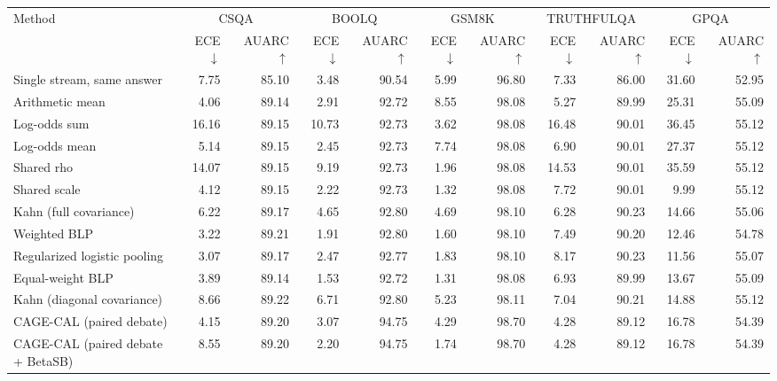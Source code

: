 \begin{tabular}{lrrrrrrrrrr}
\toprule
Method & \multicolumn{2}{c}{CSQA} & \multicolumn{2}{c}{BOOLQ} & \multicolumn{2}{c}{GSM8K} & \multicolumn{2}{c}{TRUTHFULQA} & \multicolumn{2}{c}{GPQA} \\
 & ECE $\downarrow$ & AUARC $\uparrow$ & ECE $\downarrow$ & AUARC $\uparrow$ & ECE $\downarrow$ & AUARC $\uparrow$ & ECE $\downarrow$ & AUARC $\uparrow$ & ECE $\downarrow$ & AUARC $\uparrow$ \\
\midrule
Single stream, same answer & 7.75 & 85.10 & 3.48 & 90.54 & 5.99 & 96.80 & 7.33 & 86.00 & 31.60 & 52.95 \\
Arithmetic mean & 4.06 & 89.14 & 2.91 & 92.72 & 8.55 & 98.08 & 5.27 & 89.99 & 25.31 & 55.09 \\
Log-odds sum & 16.16 & 89.15 & 10.73 & 92.73 & 3.62 & 98.08 & 16.48 & 90.01 & 36.45 & 55.12 \\
Log-odds mean & 5.14 & 89.15 & 2.45 & 92.73 & 7.74 & 98.08 & 6.90 & 90.01 & 27.37 & 55.12 \\
Shared rho & 14.07 & 89.15 & 9.19 & 92.73 & 1.96 & 98.08 & 14.53 & 90.01 & 35.59 & 55.12 \\
Shared scale & 4.12 & 89.15 & 2.22 & 92.73 & 1.32 & 98.08 & 7.72 & 90.01 & 9.99 & 55.12 \\
Kahn (full covariance) & 6.22 & 89.17 & 4.65 & 92.80 & 4.69 & 98.10 & 6.28 & 90.23 & 14.66 & 55.06 \\
Weighted BLP & 3.22 & 89.21 & 1.91 & 92.80 & 1.60 & 98.10 & 7.49 & 90.20 & 12.46 & 54.78 \\
Regularized logistic pooling & 3.07 & 89.17 & 2.47 & 92.77 & 1.83 & 98.10 & 8.17 & 90.23 & 11.56 & 55.07 \\
Equal-weight BLP & 3.89 & 89.14 & 1.53 & 92.72 & 1.31 & 98.08 & 6.93 & 89.99 & 13.67 & 55.09 \\
Kahn (diagonal covariance) & 8.66 & 89.22 & 6.71 & 92.80 & 5.23 & 98.11 & 7.04 & 90.21 & 14.88 & 55.12 \\
CAGE-CAL (paired debate) & 4.15 & 89.20 & 3.07 & 94.75 & 4.29 & 98.70 & 4.28 & 89.12 & 16.78 & 54.39 \\
CAGE-CAL (paired debate + BetaSB) & 8.55 & 89.20 & 2.20 & 94.75 & 1.74 & 98.70 & 4.28 & 89.12 & 16.78 & 54.39 \\
\bottomrule
\end{tabular}
